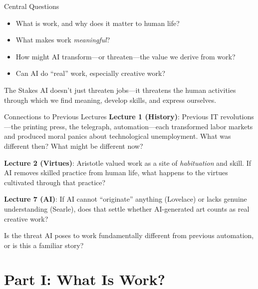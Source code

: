 ﻿\documentclass[aspectratio=169,11pt]{beamer}
\begin{document}
\begin{frame}{Central Questions}
\begin{itemize}
    \item What is work, and why does it matter to human life?
    \item What makes work \emph{meaningful}?
    \item How might AI transform---or threaten---the value we derive from work?
    \item Can AI do ``real'' work, especially creative work?
\end{itemize}

\vspace{0.3em}
\begin{alertblock}{The Stakes}
AI doesn't just threaten jobs---it threatens the human activities through which we find meaning, develop skills, and express ourselves.
\end{alertblock}
\end{frame}

\begin{frame}{Connections to Previous Lectures}
\textbf{Lecture 1 (History)}: Previous IT revolutions---the printing press, the telegraph, automation---each transformed labor markets and produced moral panics about technological unemployment. What was different then? What might be different now?

\vspace{0.2cm}
\textbf{Lecture 2 (Virtues)}: Aristotle valued work as a site of \textit{habituation} and skill. If AI removes skilled practice from human life, what happens to the virtues cultivated through that practice?

\vspace{0.2cm}
\textbf{Lecture 7 (AI)}: If AI cannot ``originate'' anything (Lovelace) or lacks genuine understanding (Searle), does that settle whether AI-generated art counts as real creative work?

\begin{discussionbox}[Discussion]
Is the threat AI poses to work fundamentally different from previous automation, or is this a familiar story?
\end{discussionbox}
\end{frame}

\section{Part I: What Is Work?}
\end{document}
